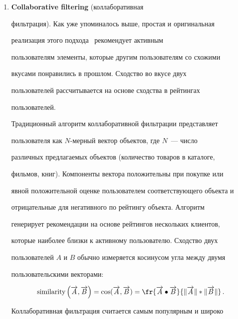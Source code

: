 \begin{enumerate}[1.]


\item {\bf Collaborative filtering} (коллаборативная


фильтрация). Как уже упоминалось выше, простая и оригинальная


реализация этого подхода~\cite{CF} рекомендует активным


пользователям элементы, которые другим пользователям со схожими


вкусами понравились в прошлом. Сходство во вкусе двух


пользователей рассчитывается на основе сходства в рейтингах


пользователей.





Традиционный алгоритм коллаборативной фильтрации представляет


пользователя как $N$-мер\-ный вектор объектов, где $N$~--- чис\-ло


различных пред\-ла\-га\-емых объектов (количество товаров в каталоге,


фильмов, книг). Компоненты вектора положительны при покупке или


явной положительной оценке пользователем соответствующего объекта и


отрицательные для негативного по рейтингу объекта. Алгоритм


генерирует рекомендации на основе рейтингов нескольких клиентов,


которые наиболее близки к активному пользователю. Сходство двух


пользователей $A$ и $B$ обычно измеряется косинусом угла между двумя


пользовательскими векторами:





$$


\mbox{similarity}\left(\overrightarrow{A},\overrightarrow{B}\right) = 


\cos(\overrightarrow{A},\overrightarrow{B}) =


\fr{\overrightarrow{A}\bullet\overrightarrow{B}}


{\|\overrightarrow{A}\|\ast\|\overrightarrow{B}\|}\,.


$$





Коллаборативная фильтрация считается самым популярным и широко



\end{enumerate}
